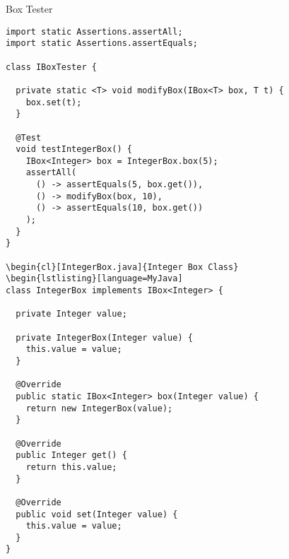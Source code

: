 \begin{cl}{Box Tester} 
\begin{lstlisting}[language=MyJava]
import static Assertions.assertAll;
import static Assertions.assertEquals;

class IBoxTester {

  private static <T> void modifyBox(IBox<T> box, T t) {
    box.set(t);
  }
  
  @Test
  void testIntegerBox() {
    IBox<Integer> box = IntegerBox.box(5);
    assertAll(
      () -> assertEquals(5, box.get()),
      () -> modifyBox(box, 10),
      () -> assertEquals(10, box.get())
    );
  }
}

\begin{cl}[IntegerBox.java]{Integer Box Class}
\begin{lstlisting}[language=MyJava]
class IntegerBox implements IBox<Integer> {
  
  private Integer value;
  
  private IntegerBox(Integer value) {
    this.value = value;
  }
  
  @Override
  public static IBox<Integer> box(Integer value) {
    return new IntegerBox(value);
  }
  
  @Override
  public Integer get() {
    return this.value;
  }
  
  @Override
  public void set(Integer value) {
    this.value = value;
  }
}
\end{lstlisting}
\end{cl}
